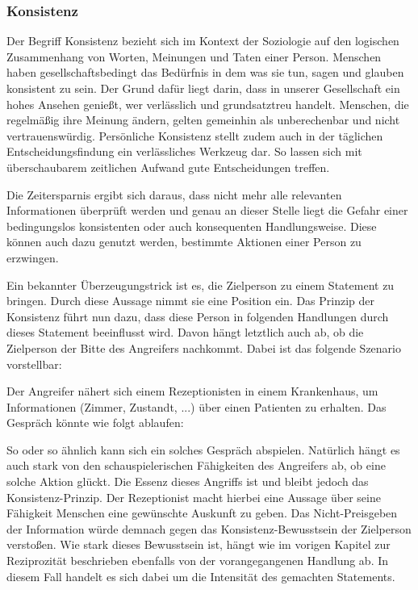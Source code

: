 \subsubsection{Konsistenz}
Der Begriff Konsistenz bezieht sich im Kontext der Soziologie auf den logischen Zusammenhang von Worten, Meinungen und Taten einer Person. Menschen haben gesellschaftsbedingt das Bedürfnis in dem was sie tun, sagen und glauben konsistent zu sein. Der Grund dafür liegt darin, dass in unserer Gesellschaft ein hohes Ansehen genießt, wer verlässlich und grundsatztreu handelt. Menschen, die regelmäßig ihre Meinung ändern, gelten gemeinhin als unberechenbar und nicht vertrauenswürdig.
Persönliche Konsistenz stellt zudem auch in der täglichen Entscheidungsfindung ein verlässliches Werkzeug dar. So lassen sich mit überschaubarem zeitlichen Aufwand gute Entscheidungen treffen.

Die Zeitersparnis ergibt sich daraus, dass nicht mehr alle relevanten Informationen überprüft werden und genau an dieser Stelle liegt die Gefahr einer bedingungslos konsistenten oder auch konsequenten Handlungsweise. Diese können auch dazu genutzt werden, bestimmte Aktionen einer Person zu erzwingen. \cite{cialdini}

Ein bekannter Überzeugungstrick ist es, die Zielperson zu einem Statement zu bringen. Durch diese Aussage nimmt sie eine Position ein. Das Prinzip der Konsistenz führt nun dazu, dass diese Person in folgenden Handlungen durch dieses Statement beeinflusst wird. Davon hängt letztlich auch ab, ob die Zielperson der Bitte des Angreifers nachkommt. Dabei ist das folgende Szenario vorstellbar:

Der Angreifer nähert sich einem Rezeptionisten in einem Krankenhaus, um Informationen (Zimmer, Zustandt, ...) über einen Patienten zu erhalten.
Das Gespräch könnte wie folgt ablaufen:

 

So oder so ähnlich kann sich ein solches Gespräch abspielen. Natürlich hängt es auch stark von den schauspielerischen Fähigkeiten des Angreifers ab, ob eine solche Aktion glückt.
Die Essenz dieses Angriffs ist und bleibt jedoch das Konsistenz-Prinzip. Der Rezeptionist macht hierbei eine Aussage über seine Fähigkeit Menschen eine gewünschte Auskunft zu geben. Das Nicht-Preisgeben der Information würde demnach gegen das Konsistenz-Bewusstsein der Zielperson verstoßen. Wie stark dieses Bewusstsein ist, hängt wie im vorigen Kapitel zur Reziprozität beschrieben ebenfalls von der vorangegangenen Handlung ab. In diesem Fall handelt es sich dabei um die Intensität des gemachten Statements.

